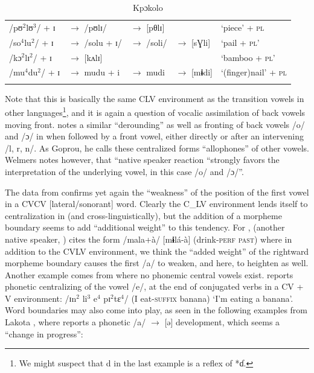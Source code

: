 \documentclass[output=paper,newtxmath,modfonts,nonflat,draft]{langsci/langscibook}
\begin{document}
\begin{table}
\label{tab:zogbo:22}
\caption{Kpɔkolo \citep[202-206]{Goprou2014}}                                  
\begin{tabular}{lllll}
\lsptoprule
/pʊ$^2$lʊ$^3$/ + ɪ 
& $\rightarrow$ /pʊlɪ/  
& $\rightarrow$ [pθlɪ]        
&
& ‘piece’ + \textsc{pl}   \\

/so$^4$lu$^2$/ + ɪ  
& $\rightarrow$ /solu + ɪ/ 
& $\rightarrow$ /soli/  
& $\rightarrow$ [sƔli]   
& ‘pail + \textsc{pl}’  \\

/kɔ$^2$lɪ$^2$/ + ɪ 
& $\rightarrow$ [kʌlɪ]     
& 
&     
& ‘bamboo + \textsc{pl}’   \\

/mu$^4$du$^2$/ + ɪ  
& $\rightarrow$ mudu + i  
& $\rightarrow$ mudi 
& $\rightarrow$ [m\textbf{ɨ}di]   
& ‘(finger)nail’ + \textsc{pl}\\
\lspbottomrule
\end{tabular}	
\end{table}

Note that this is basically the same CLV environment as the transition vowels in other languages\footnote{We might suspect that d in the last example is a reflex of *ɗ.}, and it is again a question of vocalic assimilation of back vowels moving front. \citet{Welmers1973} notes a similar “derounding” as well as fronting of back vowels /o/ and /ɔ/ in  when followed by a front vowel, either directly or after an intervening /l, r, n/. As Goprou, he calls these centralized forms “allophones” of other vowels. Welmers notes however, that “native speaker reaction “strongly favors the interpretation of the underlying vowel, in this case /o/ and /ɔ/”. 

The data from  confirms yet again the “weakness” of the position of the first vowel in a CVCV [lateral/sonorant] word. Clearly the C\_LV environment lends itself to centralization in  (and cross-linguistically), but the addition of a morpheme boundary seems to add “additional weight” to this tendency. For , \citeauthor{Kokora1976} (another native speaker, \citeyear[39]{Kokora1976}) cites the form /mala+à/ [m\textbf{ɨ}lá-à] (drink-\textsc{perf} \textsc{past}) where in addition to the CVLV environment, we think the “added weight” of the rightward morpheme boundary causes the first /a/ to weaken, and here, to heighten as well. Another example comes from { where no phonemic central vowels exist.} \citet[50]{Bentinck1978} reports phonetic centralizing of the vowel /e/, at the end of conjugated verbs in a CV + V environment:  /ɪn$^2$  li$^3$ e$^4$ pɪ$^2$tɛ$^4$/ (I eat-\textsc{suffix} banana) ‘I’m eating a banana’.  Word boundaries may also come into play, as seen in the following examples from Lakota , where \citet[47]{Guehoun1993} reports a phonetic /a/ $\rightarrow$ [ə] development, which seems a “change in progress”: 
\end{document}
